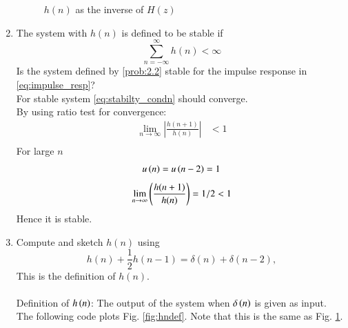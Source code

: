 \documentclass[journal,12pt,twocolumn]{IEEEtran}
\theoremstyle{remark}
\renewcommand\thesection{\arabic{section}}
\begin{document}
\begin{enumerate}[label=\thesection.\arabic*]
\begin{figure}[htbp]
\caption{$h(n)$ as the inverse of $H(z)$}
\label{fig:hn}
\end{figure}
%
\item The system with $h(n)$ is defined to be stable if
\begin{equation}
\sum_{n=-\infty}^{\infty}h(n) < \infty \label{eq:stabilty_condn}
\end{equation}
Is the system defined by \eqref{prob:2.2} stable for the impulse response in \eqref{eq:impulse_resp}?\\
\solution For stable system \eqref{eq:stabilty_condn} should converge.\\
By using ratio test for convergence:
\begin{align}
    \lim_{n \to \infty}\left|\frac{h(n + 1)}{h(n)}\right|&<1 \\
\end{align}
For large $n$ 
\begin{align}
    u\left(n\right)=u\left(n-2\right)=1
\end{align}
\begin{align}
  \lim_{n \to \infty}  \left(\frac{h(n + 1)}{h(n)}\right) = 1/2 <1
\end{align}
Hence it is stable.
\item 
Compute and sketch $h(n)$ using 
\begin{equation}
\label{eq:iir_filter_h}
h(n) + \frac{1}{2}h(n-1) = \delta(n) + \delta(n-2), 
\end{equation}
%
This is the definition of $h(n)$.
\\
\solution\\
Definition of $h\left(n\right)$: The output of the system when $\delta\left(n\right)$ is given as input.\\

The following code plots Fig. \ref{fig:hndef}. Note that this is the same as Fig. 
\ref{fig:hn}. 


\end{enumerate}
\end{document}
